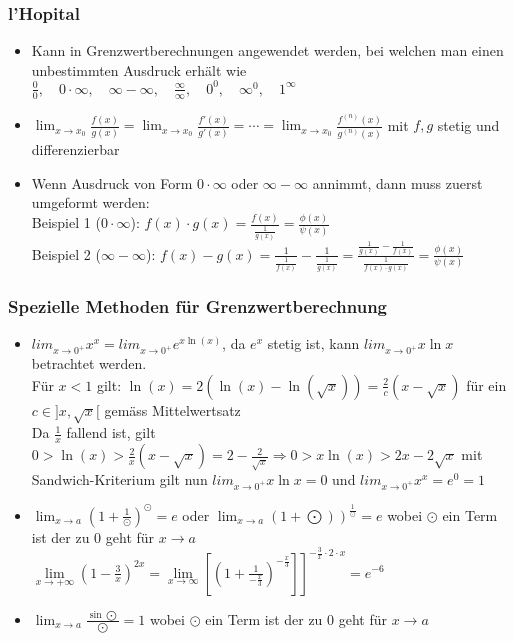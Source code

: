 \documentclass[a3paper, 11pt, landscape]{scrartcl}
\begin{document}
\begin{multicols*}{3}
		\subsubsection{l'Hopital}
		\begin{itemize}
		    \item Kann in Grenzwertberechnungen angewendet werden, bei welchen man einen unbestimmten Ausdruck erhält wie $\frac{0}{0}, \quad 0 \cdot \infty,  \quad \infty - \infty, \quad \frac{\infty}{\infty}, \quad 0^0, \quad \infty^0, \quad 1^\infty$
		    \item $\lim_{x \rightarrow x_0} \frac{f(x)}{g(x)}=\lim_{x \rightarrow x_0} \frac{f'(x)}{g'(x)}= \cdots =\lim_{x \rightarrow x_0} \frac{f^{(n)}(x)}{g^{(n)}(x)}$ mit $f, g$ stetig und differenzierbar
		    \item Wenn Ausdruck von Form $0\cdot \infty $ oder $ \infty-\infty$ annimmt, dann muss zuerst umgeformt werden:\\
		    Beispiel 1 ($0 \cdot \infty$): $f(x) \cdot g(x) = \frac{f(x)}{\tfrac{1}{g(x)}} = \frac{\phi(x)}{\psi(x)}$\\
		    Beispiel 2 ($\infty-\infty$): $f(x) - g(x) = \frac{1}{\tfrac{1}{f(x)}} - \frac{1}{\tfrac{1}{g(x)}} = \frac {\tfrac{1}{g(x)} - \tfrac{1}{f(x)}}{\tfrac{1}{f(x)\cdot g(x)}} = \frac{\phi(x)}{\psi(x)}$
		\end{itemize}
		
		\subsubsection{Spezielle Methoden für Grenzwertberechnung}
		\begin{itemize}
		    \item $lim_{x\to 0^+} x^x = lim_{x\to 0^+} e^{x\ln (x)}$, da $e^x$ stetig ist, kann $lim_{x\to 0^+} x \ln x$ betrachtet werden. \\
		    Für $x<1$ gilt: $\ln (x)=2(\ln (x) - \ln (\sqrt{x}))=\frac{2}{c} (x-\sqrt{x})$ für ein $c\in ]x,\sqrt{x}[$ gemäss Mittelwertsatz\\
		    Da $\frac{1}{x}$ fallend ist, gilt $0>\ln (x) >\frac{2}{x} (x-\sqrt{x})=2-\frac{2}{\sqrt{x}} \Rightarrow 0>x\ln (x) >2x - 2\sqrt{x}$ mit Sandwich-Kriterium gilt nun $lim_{x\to 0^+} x \ln x = 0$ und $lim_{x\to 0^+} x^x=e^0=1$
		    \item $\lim _{x \rightarrow a}\left(1+\frac{1}{\odot}\right)^{\odot}=e$ oder $\left.\lim _{x \rightarrow a}(1+\bigodot)\right)^{\frac{1}{\odot}}=e$ wobei $\odot$ ein Term ist der zu 0 geht für $x\to a$\\
		    $\left.\lim\limits _{x \rightarrow+\infty}\left(1-\frac{3}{x}\right)^{2 x}=\lim \limits_{x \rightarrow \infty}\left[\left(1+\frac{1}{-\frac{x}{3}}\right)^{-\frac{x}{3}}\right]\right]^{-\frac{3}{x} \cdot 2 \cdot x} = e^{-6}$
		    \item $\lim _{x \rightarrow a} \frac{\sin \bigodot}{\bigodot}=1$ wobei $\odot$ ein Term ist der zu 0 geht für $x\to a$
		\end{itemize}
		

\end{multicols*}
\end{document}
